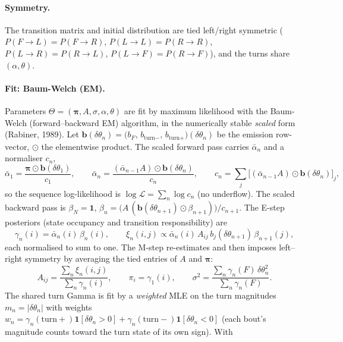 \documentclass[11pt]{article}
\begin{document}
\paragraph{Symmetry.}
The transition matrix and initial distribution are tied left/right symmetric
($P(F{\to}L)=P(F{\to}R)$, $P(L{\to}L)=P(R{\to}R)$, $P(L{\to}R)=P(R{\to}L)$,
$P(L{\to}F)=P(R{\to}F)$), and the turns share $(\alpha,\theta)$.

\paragraph{Fit: Baum-Welch (EM).}
Parameters $\Theta=(\boldsymbol\pi,A,\sigma,\alpha,\theta)$ are fit by maximum
likelihood with the Baum-Welch (forward--backward EM) algorithm, in the
numerically stable \emph{scaled} form (Rabiner, 1989). Let
$\mathbf b(\delta\theta_n)=\big(b_F,\,b_{\text{turn}-},\,b_{\text{turn}+}\big)(\delta\theta_n)$
be the emission row-vector, $\odot$ the elementwise product. The scaled forward
pass carries $\bar\alpha_n$ and a normaliser $c_n$,
\begin{equation}
\bar\alpha_1=\frac{\boldsymbol\pi\odot\mathbf b(\delta\theta_1)}{c_1},\qquad
\bar\alpha_n=\frac{(\bar\alpha_{n-1}A)\odot\mathbf b(\delta\theta_n)}{c_n},\qquad
c_n=\textstyle\sum_j\big[(\bar\alpha_{n-1}A)\odot\mathbf b(\delta\theta_n)\big]_j,
\end{equation}
so the sequence log-likelihood is $\log\mathcal L=\sum_n\log c_n$ (no underflow).
The scaled backward pass is $\beta_N=\mathbf 1$,
$\beta_n=\big(A\,(\mathbf b(\delta\theta_{n+1})\odot\beta_{n+1})\big)/c_{n+1}$.
The E-step posteriors (state occupancy and transition responsibility) are
\begin{equation}
\gamma_n(i)=\bar\alpha_n(i)\,\beta_n(i),\qquad
\xi_n(i,j)\propto\bar\alpha_n(i)\,A_{ij}\,b_j(\delta\theta_{n+1})\,\beta_{n+1}(j),
\end{equation}
each normalised to sum to one. The M-step re-estimates and then imposes
left--right symmetry by averaging the tied entries of $A$ and $\boldsymbol\pi$:
\begin{equation}
A_{ij}=\frac{\sum_n\xi_n(i,j)}{\sum_n\gamma_n(i)},\qquad
\pi_i=\gamma_1(i),\qquad
\sigma^2=\frac{\sum_n\gamma_n(F)\,\delta\theta_n^2}{\sum_n\gamma_n(F)} .
\end{equation}
The shared turn Gamma is fit by a \emph{weighted} MLE on the turn magnitudes
$m_n=|\delta\theta_n|$ with weights
$w_n=\gamma_n(\text{turn}+)\mathbf 1[\delta\theta_n{>}0]+\gamma_n(\text{turn}-)\mathbf 1[\delta\theta_n{<}0]$
(each bout's magnitude counts toward the turn state of its own sign). With
\end{document}
